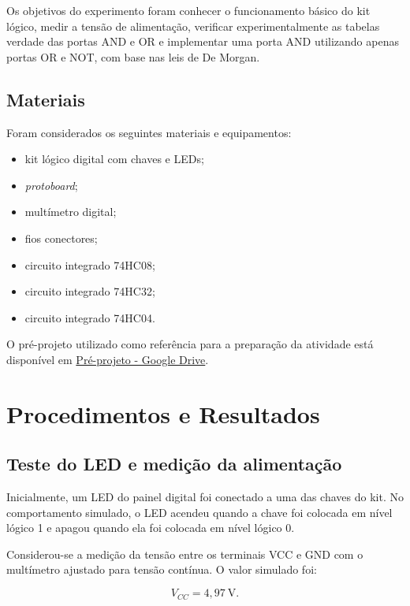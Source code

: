 \documentclass[12pt]{article}
\begin{document}
Os objetivos do experimento foram conhecer o funcionamento básico do kit lógico,
medir a tensão de alimentação, verificar experimentalmente as tabelas verdade das
portas AND e OR e implementar uma porta AND utilizando apenas portas OR e NOT,
com base nas leis de De Morgan.

\subsection{Materiais}
\label{sec:materiais}

Foram considerados os seguintes materiais e equipamentos:

\begin{itemize}
    \item kit lógico digital com chaves e LEDs;
    \item \textit{protoboard};
    \item multímetro digital;
    \item fios conectores;
    \item circuito integrado 74HC08;
    \item circuito integrado 74HC32;
    \item circuito integrado 74HC04.
\end{itemize}

O pré-projeto utilizado como referência para a preparação da atividade está disponível em
\href{https://drive.google.com/file/d/1xrnp6LJTi8HymDi-AswCgr1Z5TA05lby/view?usp=drivesdk}{Pré-projeto - Google Drive}.

\section{Procedimentos e Resultados}
\label{sec:procedimentos}

\subsection{Teste do LED e medição da alimentação}
\label{sec:alimentacao}

Inicialmente, um LED do painel digital foi conectado a uma das chaves do kit.
No comportamento simulado, o LED acendeu quando a chave foi colocada em nível
lógico 1 e apagou quando ela foi colocada em nível lógico 0.

Considerou-se a medição da tensão entre os terminais VCC e GND com o multímetro
ajustado para tensão contínua. O valor simulado foi:

\begin{equation}
    V_{CC}=4{,}97\ \text{V}.
\end{equation}
\end{document}
